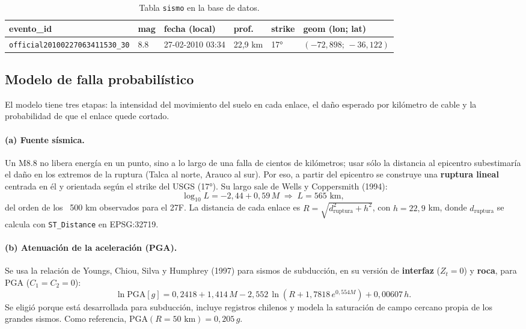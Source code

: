 \documentclass[11pt,a4paper]{article}
\newcommand{\cod}[1]{\texttt{#1}}
\begin{document}
\begin{table}[h]
\centering
\small
\begin{tabular}{llllll}
\toprule
evento\_id & mag & fecha (local) & prof. & strike & geom (lon; lat) \\
\midrule
\cod{official20100227063411530\_30} & 8.8 & 27-02-2010 03:34 & 22,9 km & 17° & $(-72{,}898;\,-36{,}122)$ \\
\bottomrule
\end{tabular}
\caption{Tabla \cod{sismo} en la base de datos.}
\end{table}

\subsection{Modelo de falla probabilístico}
El modelo tiene tres etapas: la intensidad del movimiento del suelo en cada enlace, el daño esperado
por kilómetro de cable y la probabilidad de que el enlace quede cortado.

\paragraph{(a) Fuente sísmica.} Un M8.8 no libera energía en un punto, sino a lo largo de una falla
de cientos de kilómetros; usar sólo la distancia al epicentro subestimaría el daño en los extremos de
la ruptura (Talca al norte, Arauco al sur). Por eso, a partir del epicentro se construye una
\textbf{ruptura lineal} centrada en él y orientada según el strike del USGS (17°). Su largo sale de
Wells y Coppersmith (1994):
\begin{equation}
\log_{10} L = -2{,}44 + 0{,}59\,M \;\Rightarrow\; L = 565 \text{ km},
\end{equation}
del orden de los ~500 km observados para el 27F. La distancia de cada enlace es
$R = \sqrt{d_{\text{ruptura}}^2 + h^2}$, con $h = 22{,}9$ km, donde $d_{\text{ruptura}}$ se calcula
con \cod{ST\_Distance} en EPSG:32719.

\paragraph{(b) Atenuación de la aceleración (PGA).} Se usa la relación de Youngs, Chiou, Silva y
Humphrey (1997) para sismos de subducción, en su versión de \textbf{interfaz} ($Z_t = 0$) y
\textbf{roca}, para PGA ($C_1 = C_2 = 0$):
\begin{equation}
\ln \mathrm{PGA}[g] = 0{,}2418 + 1{,}414\,M - 2{,}552\,\ln\!\left(R + 1{,}7818\, e^{0{,}554 M}\right) + 0{,}00607\,h .
\end{equation}
Se eligió porque está desarrollada para subducción, incluye registros chilenos y modela la saturación
de campo cercano propia de los grandes sismos. Como referencia, $\mathrm{PGA}(R = 50\text{ km}) = 0{,}205\,g$.
\end{document}
